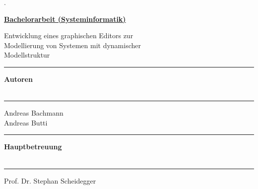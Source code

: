\begin{titlepage}


\begin{minipage}[b]{0.117\textwidth}
\hskip 0.05cm
\end{minipage}
\begin{minipage}[b]{0.91\textwidth}
\begin{tiny}.\end{tiny}\vskip 2.8cm
	{\huge
	
	\textbf{\underline{Bachelorarbeit (Systeminformatik)}}
	
	\vskip 0.5cm
	
	Entwicklung eines graphischen Editors zur \\
	Modellierung von Systemen mit dynamischer \\
	Modellstruktur
	\vskip 1.5cm}
	
	\begin{minipage}[b]{0.27\textwidth}
	\hrule\vskip 0.5cm
		\textbf{Autoren}\\
		\\
	\end{minipage}
	\begin{minipage}[b]{0.03\textwidth}
	\hskip 0.5cm
	\end{minipage}
	\begin{minipage}[b]{0.6\textwidth}
	\hrule\vskip 0.5cm
		Andreas Bachmann\\
		Andreas Butti\\
	\end{minipage}
	
	\begin{minipage}[b]{0.27\textwidth}
	\hrule\vskip 0.5cm
		\textbf{Hauptbetreuung}\\
		\\
	\end{minipage}
	\begin{minipage}[b]{0.03\textwidth}
	\hskip 0.5cm
	\end{minipage}
	\begin{minipage}[b]{0.6\textwidth}
	\hrule\vskip 0.5cm
		Prof. Dr. Stephan Scheidegger\\
		\\
	\end{minipage}
	

\end{minipage}
\end{titlepage}
